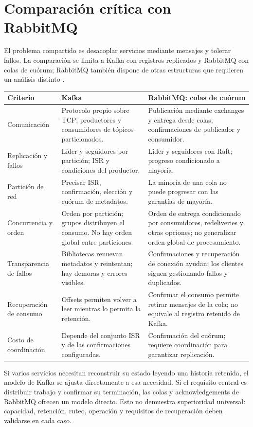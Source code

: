 \documentclass[11pt,a4paper]{article}
\begin{document}
\section{Comparación crítica con RabbitMQ}
El problema compartido es desacoplar servicios mediante mensajes y tolerar fallos. La comparación se limita a Kafka con registros replicados y RabbitMQ con colas de cuórum; RabbitMQ también dispone de otras estructuras que requieren un análisis distinto \cite{kafka391design,rabbitquorum,rabbitconfirms}.
\begin{longtable}{P{.19\textwidth}P{.35\textwidth}P{.35\textwidth}}
\toprule Criterio & Kafka & RabbitMQ: colas de cuórum\\\midrule\endhead
Comunicación & Protocolo propio sobre TCP; productores y consumidores de tópicos particionados. & Publicación mediante exchanges y entrega desde colas; confirmaciones de publicador y consumidor.\\
Replicación y fallos & Líder y seguidores por partición; ISR y condiciones del productor. & Líder y seguidores con Raft; progreso condicionado a mayoría.\\
Partición de red & Precisar ISR, confirmación, elección y cuórum de metadatos. & La minoría de una cola no puede progresar con las garantías de mayoría.\\
Concurrencia y orden & Orden por partición; grupos distribuyen el consumo. No hay orden global entre particiones. & Orden de entrega condicionado por consumidores, redeliveries y otras opciones; no generalizar orden global de procesamiento.\\
Transparencia de fallos & Bibliotecas renuevan metadatos y reintentan; hay demoras y errores visibles. & Confirmaciones y recuperación de conexión ayudan; los clientes siguen gestionando fallos y duplicados.\\
Recuperación de consumo & Offsets permiten volver a leer mientras lo permita la retención. & Confirmar el consumo permite retirar mensajes de la cola; no equivale al registro retenido de Kafka.\\
Costo de coordinación & Depende del conjunto ISR y de las confirmaciones configuradas. & Confirmación del cuórum; requiere coordinación para garantizar replicación.\\\bottomrule
\end{longtable}

Si varios servicios necesitan reconstruir su estado leyendo una historia retenida, el modelo de Kafka se ajusta directamente a esa necesidad. Si el requisito central es distribuir trabajo y confirmar su terminación, las colas y acknowledgements de RabbitMQ ofrecen un modelo directo. Esto no demuestra superioridad universal: capacidad, retención, ruteo, operación y requisitos de recuperación deben validarse en cada caso.
\end{document}
